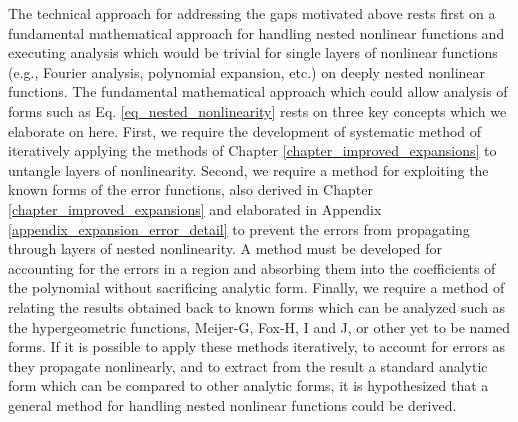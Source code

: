 The technical approach for addressing the gaps motivated above rests first on a fundamental mathematical approach for handling nested nonlinear functions and executing analysis which would be trivial for single layers of nonlinear functions (e.g., Fourier analysis, polynomial expansion, etc.) on deeply nested nonlinear functions.  The fundamental mathematical approach which could allow analysis of forms such as Eq. \ref{eq_nested_nonlinearity} rests on three key concepts which we elaborate on here.  First, we require the development of systematic method of iteratively applying the methods of Chapter \ref{chapter_improved_expansions} to untangle layers of nonlinearity.  Second, we require a method for exploiting the known forms of the error functions, also derived in Chapter \ref{chapter_improved_expansions} and elaborated in Appendix \ref{appendix_expansion_error_detail} to prevent the errors from propagating through layers of nested nonlinearity.  A method must be developed for accounting for the errors in a region and absorbing them into the coefficients of the polynomial without sacrificing analytic form.  Finally, we require a method of relating the results obtained back to known forms which can be analyzed such as the hypergeometric functions, Meijer-G, Fox-H, I and J, or other yet to be named forms.  If it is possible to apply these methods iteratively, to account for errors as they propagate nonlinearly, and to extract from the result a standard analytic form which can be compared to other analytic forms, it is hypothesized that a general method for handling nested nonlinear functions could be derived.

